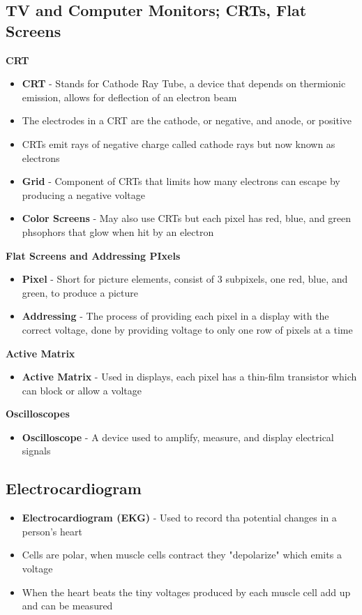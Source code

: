 \subsection{TV and Computer Monitors; CRTs, Flat Screens}
\textbf{CRT}
\begin{itemize}
    \item \textbf{CRT} - Stands for Cathode Ray Tube, a device that depends on thermionic emission, allows for deflection of an electron beam
    \item The electrodes in a CRT are the cathode, or negative, and anode, or positive
    \item CRTs emit rays of negative charge called cathode rays but now known as electrons
    \item \textbf{Grid} - Component of CRTs that limits how many electrons can escape by producing a negative voltage
    \item \textbf{Color Screens} - May also use CRTs but each pixel has red, blue, and green phsophors that glow when hit by an electron
\end{itemize}

\textbf{Flat Screens and Addressing PIxels}
\begin{itemize}
    \item \textbf{Pixel} - Short for picture elements, consist of 3 subpixels, one red, blue, and green, to produce a picture
    \item \textbf{Addressing} - The process of providing each pixel in a display with the correct voltage, done by providing voltage to only one row of pixels at a time
\end{itemize}

\textbf{Active Matrix}
\begin{itemize}
    \item \textbf{Active Matrix} - Used in displays, each pixel has a thin-film transistor which can block or allow a voltage
\end{itemize}

\textbf{Oscilloscopes}
\begin{itemize}
    \item \textbf{Oscilloscope} - A device used to amplify, measure, and display electrical signals
\end{itemize}

\subsection{Electrocardiogram}
\begin{itemize}
    \item \textbf{Electrocardiogram (EKG)} - Used to record tha potential changes in a person's heart
    \item Cells are polar, when muscle cells contract they "depolarize" which emits a voltage
    \item When the heart beats the tiny voltages produced by each muscle cell add up and can be measured
\end{itemize}

\newpage